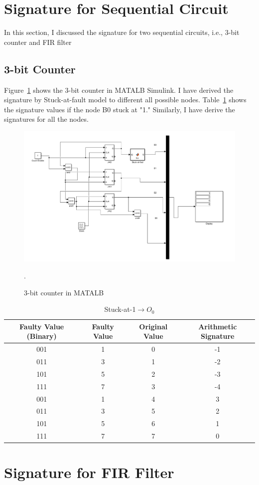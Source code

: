 \section{Signature for Sequential Circuit}


In this section, I discussed the signature for two sequential circuits, i.e., 3-bit counter and FIR filter

\subsection{3-bit Counter}


Figure~\ref{fig:matlab} shows the 3-bit counter in MATALB Simulink. I have derived the signature by Stuck-at-fault model to different all possible nodes. Table~\ref{s@1-O0}  shows the signature values if the node B0 stuck at "1." Similarly, I have derive the signatures for all the nodes.



\begin{figure}
 \centering
  \captionsetup{justification=centering}    
   \includegraphics[scale=0.4]{Figures/matlab-counter.pdf}
   \caption{3-bit counter in MATALB}.
\label{fig:matlab}
\end{figure}


\begin{table}[tb!]
\center
\caption{Stuck-at-1$\rightarrow O_0$}

\label{s@1-O0}

\begin{tabular}{|c | c| c | c| } 
 \hline
 \rowcolor{lightgray}
Faulty Value (Binary) & Faulty Value & Original Value & Arithmetic Signature   \\ 
\hline
 
 
 001& 1 &0 & -1  \\
 \hline
 011 & 3 & 1 & -2 \\ 
 \hline
 
 101 & 5 & 2 & -3 \\
 \hline
 111& 7& 3& -4 \\
 \hline
 001 & 1  &  4& 3 \\
 \hline
 011 & 3 & 5 &2  \\
 \hline
 101 & 5 & 6 & 1 \\
 \hline
 111 & 7 & 7 & 0 \\
 \hline
 
 
\end{tabular}
\end{table}



\section{Signature for FIR Filter}
